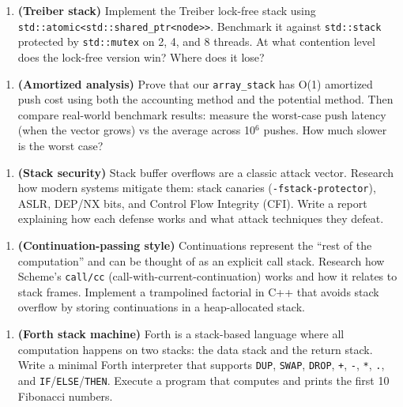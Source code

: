 \begin{enumerate}
\item \textbf{(Treiber stack)} Implement the Treiber lock-free stack using \texttt{std::atomic<std::shared\_ptr<node>>}. Benchmark it against \texttt{std::stack} protected by \texttt{std::mutex} on 2, 4, and 8 threads. At what contention level does the lock-free version win? Where does it lose?
\end{enumerate}

\begin{enumerate}
\item \textbf{(Amortized analysis)} Prove that our \texttt{array\_stack} has O(1) amortized push cost using both the accounting method and the potential method. Then compare real-world benchmark results: measure the worst-case push latency (when the vector grows) vs the average across 10$^{6}$ pushes. How much slower is the worst case?
\end{enumerate}

\begin{enumerate}
\item \textbf{(Stack security)} Stack buffer overflows are a classic attack vector. Research how modern systems mitigate them: stack canaries (\texttt{-fstack-protector}), ASLR, DEP/NX bits, and Control Flow Integrity (CFI). Write a report explaining how each defense works and what attack techniques they defeat.
\end{enumerate}

\begin{enumerate}
\item \textbf{(Continuation-passing style)} Continuations represent the ``rest of the computation'' and can be thought of as an explicit call stack. Research how Scheme's \texttt{call/cc} (call-with-current-continuation) works and how it relates to stack frames. Implement a trampolined factorial in C++ that avoids stack overflow by storing continuations in a heap-allocated stack.
\end{enumerate}

\begin{enumerate}
\item \textbf{(Forth stack machine)} Forth is a stack-based language where all computation happens on two stacks: the data stack and the return stack. Write a minimal Forth interpreter that supports \texttt{DUP}, \texttt{SWAP}, \texttt{DROP}, \texttt{+}, \texttt{-}, \texttt{*}, \texttt{.}, and \texttt{IF}/\texttt{ELSE}/\texttt{THEN}. Execute a program that computes and prints the first 10 Fibonacci numbers.
\end{enumerate}

